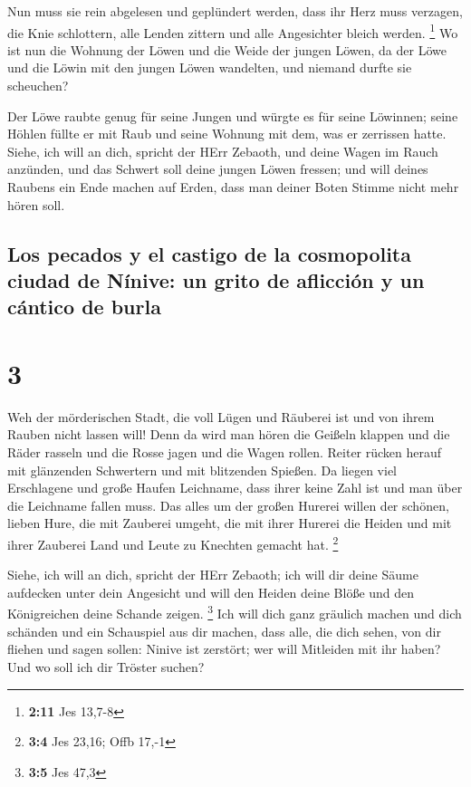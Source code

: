 Nun muss sie rein abgelesen und geplündert werden, dass
ihr Herz muss verzagen, die Knie schlottern, alle Lenden zittern und
alle Angesichter bleich werden. \footnote{\textbf{2:11} Jes 13,7-8}
 Wo ist nun die Wohnung der Löwen und die Weide der
jungen Löwen, da der Löwe und die Löwin mit den jungen Löwen wandelten,
und niemand durfte sie scheuchen?

 Der Löwe raubte genug für seine Jungen und würgte es für
seine Löwinnen; seine Höhlen füllte er mit Raub und seine Wohnung mit
dem, was er zerrissen hatte.  Siehe, ich will an dich,
spricht der HErr Zebaoth, und deine Wagen im Rauch anzünden, und das
Schwert soll deine jungen Löwen fressen; und will deines Raubens ein
Ende machen auf Erden, dass man deiner Boten Stimme nicht mehr hören
soll.

\hypertarget{los-pecados-y-el-castigo-de-la-cosmopolita-ciudad-de-nuxednive-un-grito-de-aflicciuxf3n-y-un-cuxe1ntico-de-burla}{%
\subsection{Los pecados y el castigo de la cosmopolita ciudad de Nínive:
un grito de aflicción y un cántico de
burla}\label{los-pecados-y-el-castigo-de-la-cosmopolita-ciudad-de-nuxednive-un-grito-de-aflicciuxf3n-y-un-cuxe1ntico-de-burla}}

\hypertarget{section-2}{%
\section{3}\label{section-2}}

 Weh der mörderischen Stadt, die voll Lügen und Räuberei
ist und von ihrem Rauben nicht lassen will!  Denn da wird
man hören die Geißeln klappen und die Räder rasseln und die Rosse jagen
und die Wagen rollen.  Reiter rücken herauf mit glänzenden
Schwertern und mit blitzenden Spießen. Da liegen viel Erschlagene und
große Haufen Leichname, dass ihrer keine Zahl ist und man über die
Leichname fallen muss.  Das alles um der großen Hurerei
willen der schönen, lieben Hure, die mit Zauberei umgeht, die mit ihrer
Hurerei die Heiden und mit ihrer Zauberei Land und Leute zu Knechten
gemacht hat. \footnote{\textbf{3:4} Jes 23,16; Offb 17,-1}

 Siehe, ich will an dich, spricht der HErr Zebaoth; ich
will dir deine Säume aufdecken unter dein Angesicht und will den Heiden
deine Blöße und den Königreichen deine Schande zeigen. \footnote{\textbf{3:5}
  Jes 47,3}  Ich will dich ganz gräulich machen und dich
schänden und ein Schauspiel aus dir machen,  dass alle,
die dich sehen, von dir fliehen und sagen sollen: Ninive ist zerstört;
wer will Mitleiden mit ihr haben? Und wo soll ich dir Tröster suchen?

